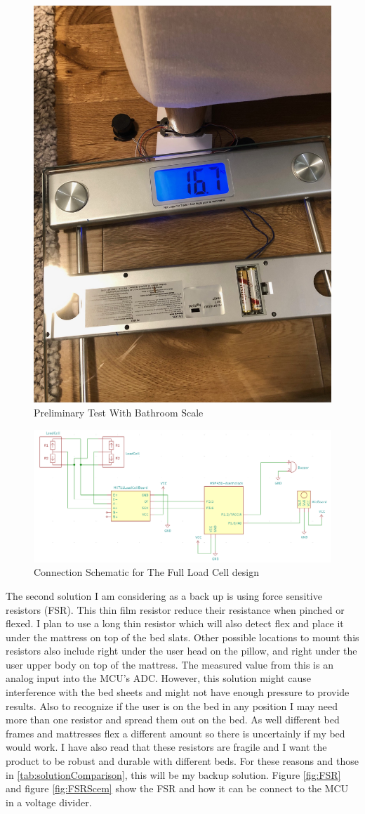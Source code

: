 \documentclass[11pt]{article}
\begin{document}
\begin{figure}[H]
	\centering
	\includegraphics[width = 0.5\linewidth, angle = 270]{preliminarytest}
	\caption{Preliminary Test With Bathroom Scale}
	\label{fig:preliminary}
\end{figure}
\begin{figure}[H]
	\centering
	\includegraphics[width = \linewidth]{fullScem}
	\caption{Connection Schematic for The Full Load Cell design}
	\label{fig:loadcellconnetion}
\end{figure}
\newpage
The second solution I am considering as a back up is using force sensitive resistors (FSR).
This thin film resistor reduce their resistance when pinched or flexed. 
I plan to use a long thin resistor which will also detect flex and place it under the mattress on top of the bed slats. 
Other possible locations to mount this resistors also include right under the user head on the pillow, and right under the user upper body on top of the mattress. 
The measured value from this is an analog input into the MCU's ADC. 
However, this solution might cause interference with the bed sheets and might not have enough pressure to provide results.
Also to recognize if the user is on the bed in any position I may need more than one resistor and spread them out on the bed. 
As well different bed frames and mattresses flex a different amount so there is uncertainly if my bed would work.
I have also read that these resistors are fragile and I want the product to be robust and durable with different beds.
For these reasons and those in \ref{tab:solutionComparison}, this will be my backup solution.
Figure \ref{fig:FSR} and figure \ref{fig:FSRScem} show the FSR and how it can be connect to the MCU in a voltage divider. 
\end{document}
